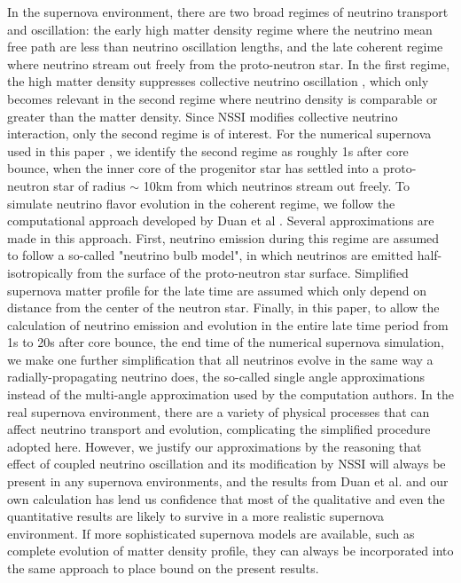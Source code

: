 \documentclass[11pt, oneside]{article}   	%
\begin{document}
In the supernova environment, there are two broad regimes of neutrino transport and oscillation: the early high matter density regime where the neutrino mean free path are less than neutrino oscillation lengths, and the late coherent regime where neutrino stream out freely from the proto-neutron star. In the first regime, the high matter density suppresses collective neutrino oscillation \cite{Chakraborty}, which only becomes relevant in the second regime where neutrino density is comparable or greater than the matter density. Since NSSI modifies collective neutrino interaction, only the second regime is of interest. For the numerical supernova used in this paper \cite{Nakasato}, we identify the second regime as roughly 1s after core bounce, when the inner core of the progenitor star has settled into a proto-neutron star of radius $\sim$ 10km from which neutrinos stream out freely. To simulate neutrino flavor evolution in the coherent regime, we follow the computational approach developed by Duan et al \cite{Duan2}.  Several approximations are made in this approach. First, neutrino emission during this regime are assumed to follow a so-called "neutrino bulb model", in which neutrinos are emitted half-isotropically from the surface of the proto-neutron star surface. Simplified supernova matter profile for the late time are assumed which only depend on distance from the center of the neutron star. Finally, in this paper, to allow the calculation of neutrino emission and evolution in the entire late time period from 1s to 20s after core bounce, the end time of the numerical supernova simulation, we make one further simplification that all neutrinos evolve in the same way a radially-propagating neutrino does, the so-called single angle approximations instead of the multi-angle approximation used by the computation authors. In the real supernova environment, there are a variety of physical processes that can affect neutrino transport and evolution, complicating the simplified procedure adopted here. However, we justify our approximations by the reasoning that effect of coupled neutrino oscillation and its modification by NSSI will always be present in any supernova environments, and the results from Duan et al. \cite{Duan1, Duan2} and our own calculation has lend us confidence that most of the qualitative and even the quantitative results are likely to survive in a more realistic supernova environment. If more sophisticated supernova models are available, such as complete evolution of matter density profile, they can always be incorporated into the same approach to place bound on the present results.
\end{document}
